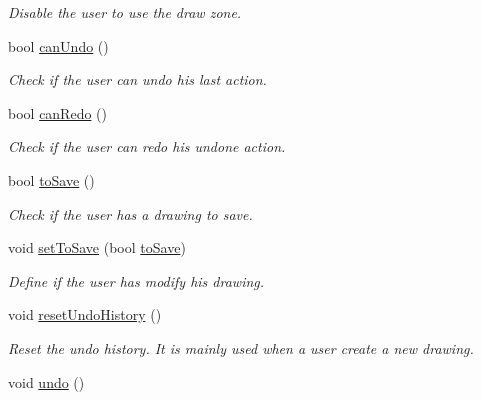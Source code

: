\begin{DoxyCompactItemize}
\begin{DoxyCompactList}\small\item\em Disable the user to use the draw zone. \end{DoxyCompactList}\item 
bool \hyperlink{classDrawingController_a54257fb927776ccd12f01ba3e234df3c}{can\+Undo} ()
\begin{DoxyCompactList}\small\item\em Check if the user can undo his last action. \end{DoxyCompactList}\item 
bool \hyperlink{classDrawingController_a21adceb4d955a915390b0322940b5269}{can\+Redo} ()
\begin{DoxyCompactList}\small\item\em Check if the user can redo his undone action. \end{DoxyCompactList}\item 
bool \hyperlink{classDrawingController_aad49b1662ead0118d5b21d6d4899e758}{to\+Save} ()
\begin{DoxyCompactList}\small\item\em Check if the user has a drawing to save. \end{DoxyCompactList}\item 
void \hyperlink{classDrawingController_a5d544a8c5e81f3c45b14ff348a77f837}{set\+To\+Save} (bool \hyperlink{classDrawingController_aad49b1662ead0118d5b21d6d4899e758}{to\+Save})
\begin{DoxyCompactList}\small\item\em Define if the user has modify his drawing. \end{DoxyCompactList}\item 
\hypertarget{classDrawingController_a4e0fd7449458f77d76e35566c86669e6}{}void \hyperlink{classDrawingController_a4e0fd7449458f77d76e35566c86669e6}{reset\+Undo\+History} ()\label{classDrawingController_a4e0fd7449458f77d76e35566c86669e6}

\begin{DoxyCompactList}\small\item\em Reset the undo history. It is mainly used when a user create a new drawing. \end{DoxyCompactList}\item 
\hypertarget{classDrawingController_a1b0cc1d8af0dc7c666aa839bae23a9c3}{}void \hyperlink{classDrawingController_a1b0cc1d8af0dc7c666aa839bae23a9c3}{undo} ()\label{classDrawingController_a1b0cc1d8af0dc7c666aa839bae23a9c3}


\end{DoxyCompactItemize}

